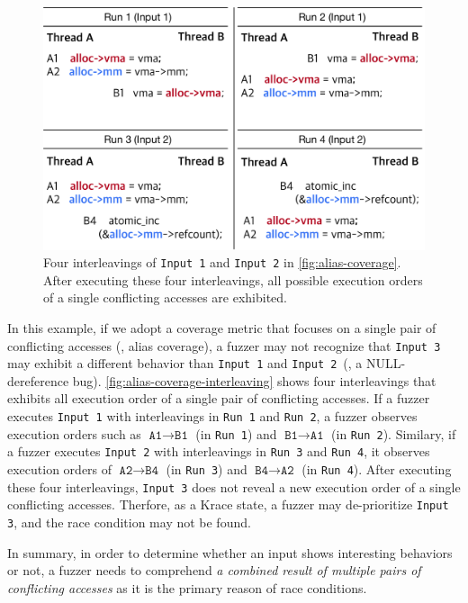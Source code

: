 \begin{figure}[t]
  \centering
  \includegraphics[width=0.9\linewidth]{fig/alias-coverage-interleaving.pdf}
  \caption{Four interleavings of \texttt{Input 1} and \texttt{Input 2}
    in \autoref{fig:alias-coverage}. After executing these four
    interleavings, all possible execution orders of a single
    conflicting accesses are exhibited.}
  \label{fig:alias-coverage-interleaving}
\end{figure}

In this example, if we adopt a coverage metric that focuses on a
single pair of conflicting accesses (\eg, alias coverage), a fuzzer
may not recognize that \texttt{Input 3} may exhibit a different
behavior than \texttt{Input 1} and \texttt{Input 2}~(\ie, a
NULL-dereference bug).
%
\autoref{fig:alias-coverage-interleaving} shows four interleavings
that exhibits all execution order of a single pair of conflicting
accesses. If a fuzzer executes \texttt{Input 1} with interleavings in
\texttt{Run 1} and \texttt{Run 2}, a fuzzer observes execution orders
such as $\texttt{A1} \rightarrow \texttt{B1}$ (in \texttt{Run 1}) and
$\texttt{B1} \rightarrow \texttt{A1}$ (in \texttt{Run 2}).
%
Similary, if a fuzzer executes \texttt{Input 2} with interleavings in
\texttt{Run 3} and \texttt{Run 4}, it observes execution orders of
$\texttt{A2} \rightarrow \texttt{B4}$ (in \texttt{Run 3}) and
$\texttt{B4} \rightarrow \texttt{A2}$ (in \texttt{Run 4}).
%
After executing these four interleavings, \texttt{Input 3} does not
reveal a new execution order of a single conflicting
accesses. Therfore, as a Krace state, a fuzzer may de-prioritize
\texttt{Input 3}, and the race condition may not be found.

In summary, in order to determine whether an input shows interesting
behaviors or not, a fuzzer needs to comprehend \textit{a combined
  result of multiple pairs of conflicting accesses} as it is the
primary reason of race conditions.


